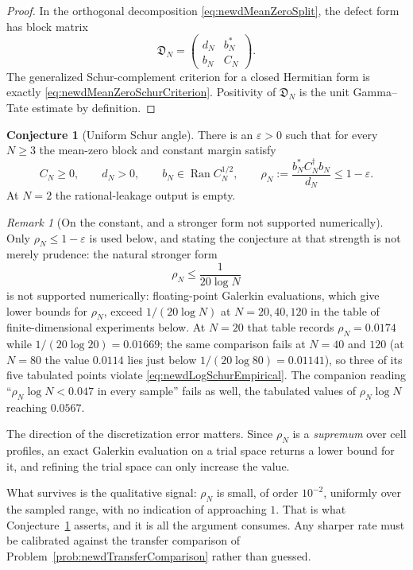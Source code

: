 \documentclass[11pt]{amsart}
\theoremstyle{definition}
\newtheorem{conjecture}[theorem]{Conjecture}
\theoremstyle{remark}
\newtheorem{remark}[theorem]{Remark}
\begin{document}
\begin{proof}
In the orthogonal decomposition \eqref{eq:newdMeanZeroSplit}, the defect
form has block matrix
\[
 \mathfrak D_N=
 \begin{pmatrix}d_N&b_N^*\\ b_N&C_N\end{pmatrix}.
\]
The generalized Schur-complement criterion for a closed Hermitian form is
exactly \eqref{eq:newdMeanZeroSchurCriterion}.  Positivity of
$\mathfrak D_N$ is the unit Gamma--Tate estimate by definition.
\end{proof}

\begin{conjecture}[Uniform Schur angle]
\label{conj:newdLogSchurAngle}
There is an $\varepsilon>0$ such that for every $N\geq3$ the mean-zero block
and constant margin satisfy
\begin{equation}\label{eq:newdLogSchurConjecture}
 C_N\geq0,
 \qquad d_N>0,
 \qquad b_N\in\operatorname{Ran}C_N^{1/2},
 \qquad
 \rho_N:=\frac{b_N^*C_N^\dagger b_N}{d_N}
 \leq1-\varepsilon .
\end{equation}
At $N=2$ the rational-leakage output is empty.
\end{conjecture}

\begin{remark}[On the constant, and a stronger form not supported numerically]
\label{rem:newdConstantCalibration}
Only $\rho_N\le1-\varepsilon$ is used below, and stating the conjecture at
that strength is not merely prudence: the natural stronger form
\begin{equation}\label{eq:newdLogSchurEmpirical}
 \rho_N\le\frac{1}{20\log N}
\end{equation}
is not supported numerically: floating-point Galerkin evaluations, which give
lower bounds for $\rho_N$, exceed $1/(20\log N)$ at $N=20,40,120$ in the
table of finite-dimensional experiments below.  At $N=20$ that table records $\rho_N=0.0174$ while
$1/(20\log20)=0.01669$; the same comparison fails at $N=40$ and $120$ (at $N=80$ the value $0.0114$ lies just below
$1/(20\log80)=0.01141$),
so three of its five tabulated points violate
\eqref{eq:newdLogSchurEmpirical}.  The companion reading
``$\rho_N\log N<0.047$ in every sample'' fails as well, the tabulated values
of $\rho_N\log N$ reaching $0.0567$.

The direction of the discretization error matters.  Since $\rho_N$ is a
\emph{supremum} over cell profiles, an exact Galerkin evaluation on a trial
space returns a lower bound for it, and refining the trial space can only
increase the value.

What survives is the qualitative signal: $\rho_N$ is small, of order
$10^{-2}$, uniformly over the sampled range, with no indication of approaching
$1$.  That is what Conjecture~\ref{conj:newdLogSchurAngle} asserts, and it is
all the argument consumes.  Any sharper rate must be calibrated against the
transfer comparison of Problem~\ref{prob:newdTransferComparison} rather than
guessed.
\end{remark}
\end{document}
